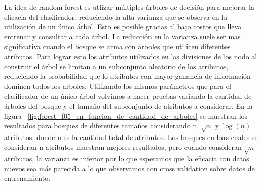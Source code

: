 
La idea de random forest es utlizar múltiples árboles de decisión para mejorar la eficacia del clasificador, reduciendo la alta varianza que se observa en la utilización de un único árbol. Esto es posible gracias al bajo costos que lleva entrenar y consultar a cada árbol. 
 La reducción en la varianza suele ser mas significativa cuando el bosque se arma con árboles que utilicen diferentes atributos. Para lograr esto los atributos utilizados en las divisiones de los nodo al construir el árbol se limitan a un subconjunto aleatorio de los atributos, reduciendo la probabilidad que lo atributos con mayor ganancia de información dominen todos los arboles. 
Utilizando los mismos parámetros que para el clasificador de un único árbol volvimos a hacer pruebas variando la cantidad de árboles del bosque y el tamaño del subconjunto de atributos a considerar. En la figura ~\ref{fig:forest_f05_en_funcion_de_cantidad_de_arboles} se muestran los resultados para bosques de diferentes tamaños considerando n, $\sqrt{n}$ y $\log(n)$ atributos, donde n es la cantidad total de atributos. Los bosques en loas cuales se consideran n atributos muestran mejores resultados, pero cuando consideran $\sqrt{n}$ atributos, la varianza es inferior por lo que esperamos que la eficacia con datos nuevos sea más parecida a lo  que observamos con cross validation sobre datos de entrenamiento. 


